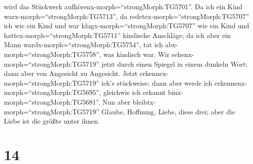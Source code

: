 wird das Stückwerk aufhörenx-morph=``strongMorph:TG5701''. 
Da ich ein Kind warx-morph=``strongMorph:TG5713'', da
redetex-morph=``strongMorph:TG5707'' ich wie ein Kind und war
klugx-morph=``strongMorph:TG5707'' wie ein Kind und
hattex-morph=``strongMorph:TG5711'' kindische Anschläge; da ich aber ein
Mann wardx-morph=``strongMorph:TG5754'', tat ich
abx-morph=``strongMorph:TG5758'', was kindisch war.  Wir
sehenx-morph=``strongMorph:TG5719'' jetzt durch einen Spiegel in einem
dunkeln Wort; dann aber von Angesicht zu Angesicht. Jetzt
erkennex-morph=``strongMorph:TG5719'' ich's stückweise; dann aber werde
ich erkennenx-morph=``strongMorph:TG5695'', gleichwie ich erkannt
binx-morph=``strongMorph:TG5681''.  Nun aber
bleibtx-morph=``strongMorph:TG5719'' Glaube, Hoffnung, Liebe, diese
drei; aber die Liebe ist die größte unter ihnen.

\hypertarget{section-13}{%
\section{14}\label{section-13}}

